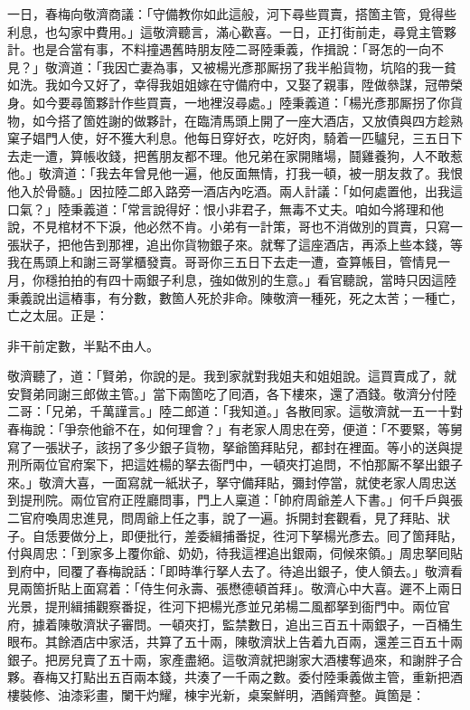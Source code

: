 一日，春梅向敬濟商議：「守備教你如此這般，河下尋些買賣，搭箇主管，覓得些利息，也勾家中費用。」這敬濟聽言，滿心歡喜。一日，正打街前走，尋覓主管夥計。也是合當有事，不料撞遇舊時朋友陸二哥陸秉義，作揖說：「哥怎的一向不見？」敬濟道：「我因亡妻為事，又被楊光彥那厮拐了我半船貨物，坑陷的我一貧如洗。我如今又好了，幸得我姐姐嫁在守備府中，又娶了親事，陞做叅謀，冠帶榮身。如今要尋箇夥計作些買賣，一地裡沒尋處。」陸秉義道：「楊光彥那厮拐了你貨物，如今搭了箇姓謝的做夥計，在臨清馬頭上開了一座大酒店，又放債與四方趁熟窠子娼門人使，好不獲大利息。他每日穿好衣，吃好肉，騎着一匹驢兒，三五日下去走一遭，算帳收錢，把舊朋友都不理。{}他兄弟在家開賭場，鬪雞養狗，人不敢惹他。」敬濟道：「我去年曾見他一遍，他反面無情，打我一頓，被一朋友救了。我恨他入於骨髓。」因拉陸二郎入路旁一酒店內吃酒。兩人計議：「如何處置他，出我這口氣？」陸秉義道：「常言說得好：恨小非君子，無毒不丈夫。咱如今將理和他說，不見棺材不下淚，他必然不肯。小弟有一計策，哥也不消做別的買賣，只寫一張狀子，把他告到那裡，追出你貨物銀子來。就奪了這座酒店，再添上些本錢，等我在馬頭上和謝三哥掌櫃發賣。哥哥你三五日下去走一遭，查算帳目，管情見一月，你穩拍拍的有四十兩銀子利息，強如做別的生意。」{}看官聽說，當時只因這陸秉義說出這樁事，有分數，數箇人死於非命。陳敬濟一種死，死之太苦；一種亡，亡之太屈。正是：

\begin{myquote}
非干前定數，半點不由人。
\end{myquote}

敬濟聽了，道：「賢弟，你說的是。我到家就對我姐夫和姐姐說。這買賣成了，就安賢弟同謝三郎做主管。」當下兩箇吃了囘酒，各下樓來，還了酒錢。敬濟分付陸二哥：「兄弟，千萬謹言。」陸二郎道：「我知道。」各散囘家。這敬濟就一五一十對春梅說：「爭奈他爺不在，如何理會？」有老家人周忠在旁，便道：「不要緊，等舅寫了一張狀子，該拐了多少銀子貨物，拏爺箇拜貼兒，都封在裡面。等小的送與提刑所兩位官府案下，把這姓楊的拏去衙門中，一頓夾打追問，不怕那厮不拏出銀子來。」{}敬濟大喜，一面寫就一紙狀子，拏守備拜貼，彌封停當，就使老家人周忠送到提刑院。兩位官府正陞廳問事，門上人稟道：「帥府周爺差人下書。」何千戶與張二官府喚周忠進見，問周爺上任之事，說了一遍。拆開封套觀看，見了拜貼、狀子。自恁要做分上，即便批行，差委緝捕番捉，徃河下拏楊光彥去。囘了箇拜貼，付與周忠：「到家多上覆你爺、奶奶，待我這裡追出銀兩，伺候來領。」周忠拏囘貼到府中，囘覆了春梅說話：「即時準行拏人去了。待追出銀子，使人領去。」敬濟看見兩箇折貼上面寫着：「侍生何永壽、張懋德頓首拜」。敬濟心中大喜。遲不上兩日光景，提刑緝捕觀察番捉，徃河下把楊光彥並兄弟楊二風都拏到衙門中。兩位官府，據着陳敬濟狀子審問。一頓夾打，監禁數日，追出三百五十兩銀子，一百桶生眼布。其餘酒店中家活，共算了五十兩，陳敬濟狀上告着九百兩，還差三百五十兩銀子。把房兒賣了五十兩，家產盡絕。這敬濟就把謝家大酒樓奪過來，和謝胖子合夥。春梅又打點出五百兩本錢，共湊了一千兩之數。委付陸秉義做主管，重新把酒樓裝修、油漆彩畫，闌干灼耀，棟宇光新，桌案鮮明，酒餚齊整。眞箇是：

